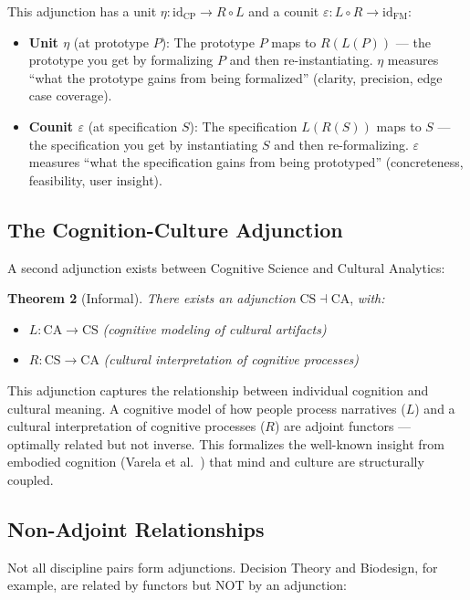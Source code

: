 \documentclass[11pt,a4paper]{article}
\begin{document}
This adjunction has a unit $\eta: \mathrm{id}_{\mathrm{CP}} \to R \circ L$ and a counit $\varepsilon: L \circ R \to \mathrm{id}_{\mathrm{FM}}$:
\begin{itemize}
    \item \textbf{Unit $\eta$} (at prototype $P$): The prototype $P$ maps to $R(L(P))$ --- the prototype you get by formalizing $P$ and then re-instantiating. $\eta$ measures ``what the prototype gains from being formalized'' (clarity, precision, edge case coverage).
    \item \textbf{Counit $\varepsilon$} (at specification $S$): The specification $L(R(S))$ maps to $S$ --- the specification you get by instantiating $S$ and then re-formalizing. $\varepsilon$ measures ``what the specification gains from being prototyped'' (concreteness, feasibility, user insight).
\end{itemize}

\subsection{The Cognition-Culture Adjunction}

A second adjunction exists between Cognitive Science and Cultural Analytics:

\textbf{Theorem 2} (Informal). \textit{There exists an adjunction} $\mathrm{CS} \dashv \mathrm{CA}$, \textit{with:}
\begin{itemize}
    \item $L: \mathrm{CA} \to \mathrm{CS}$ \textit{(cognitive modeling of cultural artifacts)}
    \item $R: \mathrm{CS} \to \mathrm{CA}$ \textit{(cultural interpretation of cognitive processes)}
\end{itemize}

This adjunction captures the relationship between individual cognition and cultural meaning. A cognitive model of how people process narratives ($L$) and a cultural interpretation of cognitive processes ($R$) are adjoint functors --- optimally related but not inverse. This formalizes the well-known insight from embodied cognition (Varela et al.\ \cite{varela1991}) that mind and culture are structurally coupled.

\subsection{Non-Adjoint Relationships}

Not all discipline pairs form adjunctions. Decision Theory and Biodesign, for example, are related by functors but NOT by an adjunction:
\end{document}
